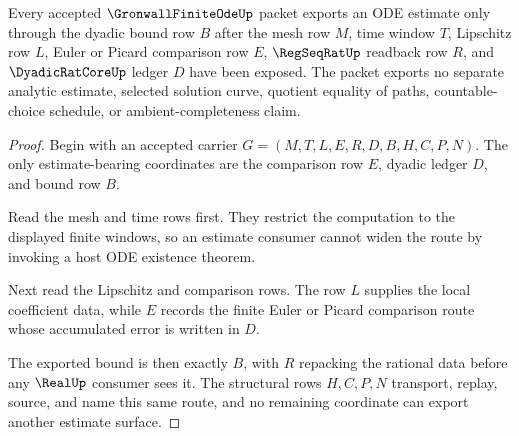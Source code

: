 \begin{theorem}
\label{thm:gronwall-finite-ode-dyadic-bound}
Every accepted $\GronwallFiniteOdeUp$ packet exports an ODE estimate only through the dyadic bound row $B$ after the mesh row $M$, time window $T$, Lipschitz row $L$, Euler or Picard comparison row $E$, $\RegSeqRatUp$ readback row $R$, and $\DyadicRatCoreUp$ ledger $D$ have been exposed. The packet exports no separate analytic estimate, selected solution curve, quotient equality of paths, countable-choice schedule, or ambient-completeness claim.
\end{theorem}
\begin{proof}
Begin with an accepted carrier $G=(M,T,L,E,R,D,B,H,C,P,N)$. The only estimate-bearing coordinates are the comparison row $E$, dyadic ledger $D$, and bound row $B$.

Read the mesh and time rows first. They restrict the computation to the displayed finite windows, so an estimate consumer cannot widen the route by invoking a host ODE existence theorem.

Next read the Lipschitz and comparison rows. The row $L$ supplies the local coefficient data, while $E$ records the finite Euler or Picard comparison route whose accumulated error is written in $D$.

The exported bound is then exactly $B$, with $R$ repacking the rational data before any $\RealUp$ consumer sees it. The structural rows $H,C,P,N$ transport, replay, source, and name this same route, and no remaining coordinate can export another estimate surface.
\end{proof}

\begin{closurestatus}{\GronwallFiniteOdeUp}
  \theoryclosure{\seedClosure}
  \formalstatus{\unformalizedV}
\end{closurestatus}
